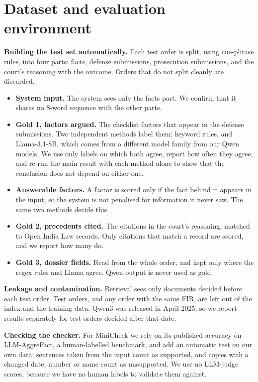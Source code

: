 \documentclass[11pt,a4paper]{article}
\begin{document}
\section{Dataset and evaluation environment}

\textbf{Building the test set automatically.} Each test order is split, using cue-phrase rules, into four parts: facts, defense submissions, prosecution submissions, and the court's reasoning with the outcome. Orders that do not split cleanly are discarded.

\begin{itemize}
\item \textbf{System input.} The system sees only the facts part. We confirm that it shares no 8-word sequence with the other parts.
\item \textbf{Gold 1, factors argued.} The checklist factors that appear in the defense submissions. Two independent methods label them: keyword rules, and Llama-3.1-8B, which comes from a different model family from our Qwen models. We use only labels on which both agree, report how often they agree, and re-run the main result with each method alone to show that the conclusion does not depend on either one.
\item \textbf{Answerable factors.} A factor is scored only if the fact behind it appears in the input, so the system is not penalised for information it never saw. The same two methods decide this.
\item \textbf{Gold 2, precedents cited.} The citations in the court's reasoning, matched to Open India Law records. Only citations that match a record are scored, and we report how many do.
\item \textbf{Gold 3, dossier fields.} Read from the whole order, and kept only where the regex rules and Llama agree. Qwen output is never used as gold.
\end{itemize}

\textbf{Leakage and contamination.} Retrieval sees only documents decided before each test order. Test orders, and any order with the same FIR, are left out of the index and the training data. Qwen3 was released in April 2025, so we report results separately for test orders decided after that date.

\textbf{Checking the checker.} For MiniCheck we rely on its published accuracy on LLM-AggreFact, a human-labelled benchmark, and add an automatic test on our own data: sentences taken from the input count as supported, and copies with a changed date, number or name count as unsupported. We use no LLM-judge scores, because we have no human labels to validate them against.
\end{document}
